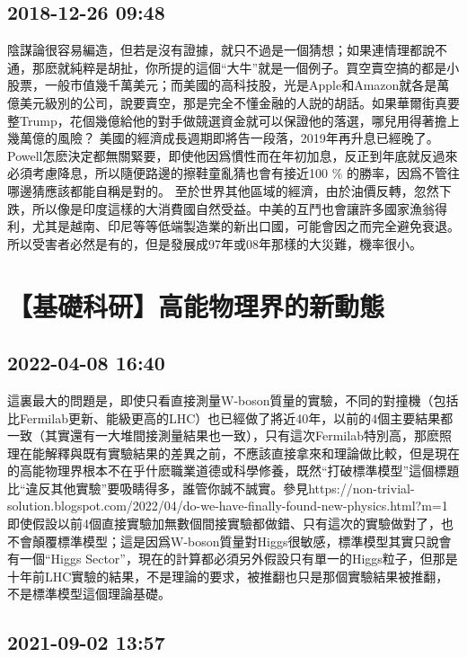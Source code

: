 \documentclass[twocolumn]{ctexart}
\begin{document}
\subsection*{2018-12-26 09:48}

陰謀論很容易編造，但若是沒有證據，就只不過是一個猜想；如果連情理都說不通，那麽就純粹是胡扯，你所提的這個“大牛”就是一個例子。買空賣空搞的都是小股票，一般市值幾千萬美元；而美國的高科技股，光是Apple和Amazon就各是萬億美元級別的公司，說要賣空，那是完全不懂金融的人説的胡話。如果華爾街真要整Trump，花個幾億給他的對手做競選資金就可以保證他的落選，哪兒用得著擔上幾萬億的風險？ 
美國的經濟成長週期即將告一段落，2019年再升息已經晚了。 Powell怎麽決定都無關緊要，即使他因爲慣性而在年初加息，反正到年底就反過來必須考慮降息，所以隨便路邊的擦鞋童亂猜也會有接近100 \% 的勝率，因爲不管往哪邊猜應該都能自稱是對的。 
至於世界其他區域的經濟，由於油價反轉，忽然下跌，所以像是印度這樣的大消費國自然受益。中美的互鬥也會讓許多國家漁翁得利，尤其是越南、印尼等等低端製造業的新出口國，可能會因之而完全避免衰退。所以受害者必然是有的，但是發展成97年或08年那樣的大災難，機率很小。
\section*{【基礎科研】高能物理界的新動態}
\subsection*{2022-04-08 16:40}

這裏最大的問題是，即使只看直接測量W-boson質量的實驗，不同的對撞機（包括比Fermilab更新、能級更高的LHC）也已經做了將近40年，以前的4個主要結果都一致（其實還有一大堆間接測量結果也一致），只有這次Fermilab特別高，那麽照理在能解釋與既有實驗結果的差異之前，不應該直接拿來和理論做比較，但是現在的高能物理界根本不在乎什麽職業道德或科學修養，既然“打破標準模型”這個標題比“違反其他實驗”要吸睛得多，誰管你誠不誠實。參見https://non-trivial-solution.blogspot.com/2022/04/do-we-have-finally-found-new-physics.html?m=1
即使假設以前4個直接實驗加無數個間接實驗都做錯、只有這次的實驗做對了，也不會顛覆標準模型；這是因爲W-boson質量對Higgs很敏感，標準模型其實只說會有一個“Higgs Sector”，現在的計算都必須另外假設只有單一的Higgs粒子，但那是十年前LHC實驗的結果，不是理論的要求，被推翻也只是那個實驗結果被推翻，不是標準模型這個理論基礎。
\subsection*{2021-09-02 13:57}
\end{document}
